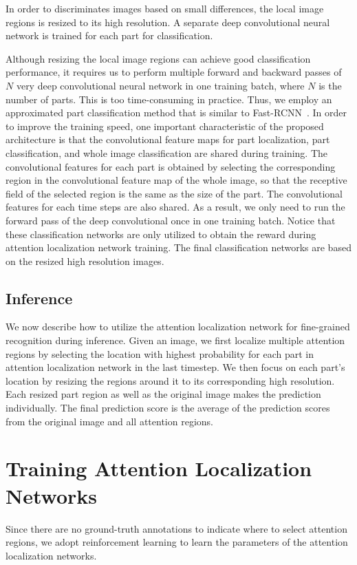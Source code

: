 \documentclass[10pt,twocolumn,letterpaper]{article}
\begin{document}
In order to discriminates images based on small differences, the local image regions is resized to its high resolution.
A separate deep convolutional neural network is trained for each part for classification.


Although resizing the local image regions can achieve good classification performance, it requires us to perform multiple forward and backward passes of $N$ very deep convolutional neural network in one training batch,
where $N$ is the number of parts.
This is too time-consuming in practice.
Thus, we employ an approximated part classification method that is similar to Fast-RCNN~\cite{girshick2015fast}.
In order to improve the training speed, one important characteristic of the proposed architecture is that the convolutional feature maps for part localization, part classification, and whole image classification are shared during training.
The convolutional features for each part is obtained by selecting the corresponding region in the convolutional feature map of the whole image, so that the receptive field of the selected region is the same as the size of the part.
The convolutional features for each time steps are also shared.
As a result, we only need to run the forward pass of the deep convolutional once in one training batch.
Notice that these classification networks are only utilized to obtain the reward during attention localization network training.
The final classification networks are based on the resized high resolution images.

\subsection{Inference}
We now describe how to utilize the attention localization network for fine-grained recognition during inference.
Given an image, we first localize multiple attention regions by selecting the location with highest probability for each part in attention localization network in the last timestep.
We then focus on each part's location by resizing the regions around it to its corresponding high resolution.
Each resized part region as well as the original image makes the prediction individually.
The final prediction score is the average of the prediction scores from the original image and all attention regions.


\section{Training Attention Localization Networks}
Since there are no ground-truth annotations to indicate where to select attention regions, we adopt reinforcement learning to learn the parameters of the attention localization networks.
\end{document}
